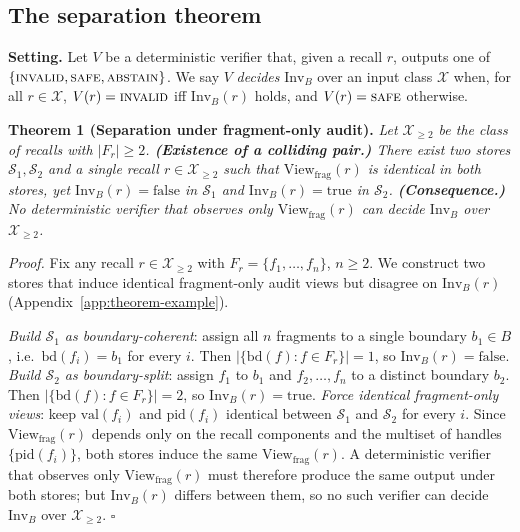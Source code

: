 \documentclass[conference,compsoc]{IEEEtran}
\begin{document}
\subsection{The separation theorem}

\smallskip
\noindent\textbf{Setting.} Let $V$ be a deterministic verifier that, given a recall $r$, outputs one of $\{\textsc{invalid},\textsc{safe},\textsc{abstain}\}$. We say $V$ \emph{decides} $\mathrm{Inv}_{B}$ over an input class $\mathcal{X}$ when, for all $r \in \mathcal{X}$, $V(r) = \textsc{invalid}$ iff $\mathrm{Inv}_{B}(r)$ holds, and $V(r) = \textsc{safe}$ otherwise.

\smallskip
\noindent\textbf{Theorem 1 (Separation under fragment-only audit).}
\emph{Let $\mathcal{X}_{\geq 2}$ be the class of recalls with $|F_{r}| \geq 2$. \textbf{(Existence of a colliding pair.)} There exist two stores $\mathcal{S}_{1}, \mathcal{S}_{2}$ and a single recall $r \in \mathcal{X}_{\geq 2}$ such that $\mathrm{View}_{\mathrm{frag}}(r)$ is identical in both stores, yet $\mathrm{Inv}_{B}(r) = \mathrm{false}$ in $\mathcal{S}_{1}$ and $\mathrm{Inv}_{B}(r) = \mathrm{true}$ in $\mathcal{S}_{2}$. \textbf{(Consequence.)} No deterministic verifier that observes only $\mathrm{View}_{\mathrm{frag}}(r)$ can decide $\mathrm{Inv}_{B}$ over $\mathcal{X}_{\geq 2}$.}

\smallskip
\textit{Proof.} Fix any recall $r \in \mathcal{X}_{\geq 2}$ with $F_{r} = \{f_{1}, \dots, f_{n}\}$, $n \geq 2$. We construct two stores that induce identical fragment-only audit views but disagree on $\mathrm{Inv}_{B}(r)$ (Appendix~\ref{app:theorem-example}).

\emph{Build $\mathcal{S}_{1}$ as boundary-coherent}: assign all $n$ fragments to a single boundary $b_{1} \in B$, i.e.\ $\mathrm{bd}(f_{i}) = b_{1}$ for every $i$. Then $|\{\mathrm{bd}(f) : f \in F_{r}\}| = 1$, so $\mathrm{Inv}_{B}(r) = \mathrm{false}$. \emph{Build $\mathcal{S}_{2}$ as boundary-split}: assign $f_{1}$ to $b_{1}$ and $f_{2}, \dots, f_{n}$ to a distinct boundary $b_{2}$. Then $|\{\mathrm{bd}(f) : f \in F_{r}\}| = 2$, so $\mathrm{Inv}_{B}(r) = \mathrm{true}$. \emph{Force identical fragment-only views}: keep $\mathrm{val}(f_{i})$ and $\mathrm{pid}(f_{i})$ identical between $\mathcal{S}_{1}$ and $\mathcal{S}_{2}$ for every $i$. Since $\mathrm{View}_{\mathrm{frag}}(r)$ depends only on the recall components and the multiset of handles $\{\mathrm{pid}(f_{i})\}$, both stores induce the same $\mathrm{View}_{\mathrm{frag}}(r)$. A deterministic verifier that observes only $\mathrm{View}_{\mathrm{frag}}(r)$ must therefore produce the same output under both stores; but $\mathrm{Inv}_{B}(r)$ differs between them, so no such verifier can decide $\mathrm{Inv}_{B}$ over $\mathcal{X}_{\geq 2}$. \hfill$\square$
\end{document}
